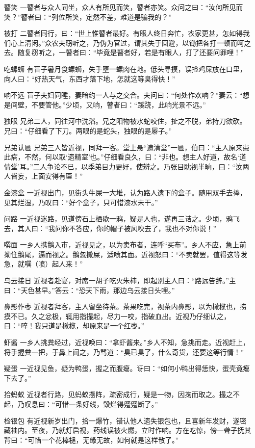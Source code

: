 \documentclass[12pt,UTF8]{ctexbook}
\begin{document}
瞽笑
一瞽者与众人同坐，众人有所见而笑，瞽者亦笑。众问之曰：“汝何所见而笑？”瞽者曰：“列位所笑，定然不差，难道是骗我的？”

被打
二瞽者同行，曰：“世上惟瞽者最好。有眼人终日奔忙，农家更甚，怎如得我们心上清闲。”众农夫窃听之，乃伪为官过，谓其失于回避，以锄把各打一顿而呵之去。随复窃听之，一瞽者曰：“毕竟是瞽者好，若是有眼人，打了还要问罪哩！”

吃螺蛳
有盲子暑月食螺蛳，失手堕一螺肉在地。低头寻摸，误捡鸡屎放在口里，向人曰：“好热天气，东西才落下地，怎就这等臭得快！”

响不远
盲子夫妇同睡，妻暗约一人与之交合。夫问曰：“何处作欢响？”妻云：“想是间壁，不要管他。”少顷，又响，瞽者曰：“蹊跷，此响光景不远。”

独眼
兄弟二人，同往河中洗浴。兄之阳物被水蛇咬住，扯之不脱，弟持刀欲砍。兄曰：“仔细看了下刀。两眼的是蛇头，独眼的是屪子。”

兄弟认匾
兄弟三人皆近视，同拜一客。堂上悬“遗清堂”一匾，伯曰：“主人原来患此病，不然，何以取‘遗精室’也。”仔细看良久，曰：“非也。想主人好道，故名‘道情堂’耳。”二人争论不已，以季弟目力更好，使辨之。乃张目眈视半晌，曰：“汝两人皆妄，上面安得有匾！”

金漆盒
一近视出门，见街头牛屎一大堆，认为路人遗下的盒子。随用双手去捧，见其烂湿，乃叹曰：“好个盒子，只可惜漆水未干。”

问路
一近视迷路，见道傍石上栖歇一鸦，疑是人也，遂再三诘之。少顷，鸦飞去，其人曰：“我问你不答应，你的帽子被风吹去了，我也不对你说！”

噀面
一乡人携鹅入市，近视见之，以为卖布者，连呼“买布”。乡人不应，急上前拗住鹅尾，逼而视之。鹅忽撒屎，适喷其面。近视怒曰：“不卖就罢，值得这等发急，就噀（喷）起人来！”

乌云接日
近视者赴宴，对席一胡子吃火朱柿，即起别主人曰：“路远告辞。”主曰：“天色甚早。”答云：“恐天下雨，那边乌云接日头哩。”

鼻影作枣
近视者拜客，主人留坐待茶。茶果吃完，视茶内鼻影，以为橄榄也，捞摸不已。久之忿极，辄用指撮起，尽力一咬，指破血出。近视乃仔细认之，曰：“啐！我只道是橄榄，却原来是一个红枣。”

虾酱
一乡人挑粪经过，近视唤曰：“拿虾酱来。”乡人不知，急挑而走。近视赶上，将手握粪一把，于鼻上闻之，乃骂道：“臭已臭了，什么奇货，还要这等行情！”

疑蛋
一近视见鱼，疑为鸭蛋，握之而腹瘪。讶曰：“如何小鸭出得恁快，蛋壳竟瘪下去了。”

拾蚂蚁
近视者行路，见蚂蚁摆阵，疏密成行，疑是一物，因掬而取之。撮之不起，乃叹息曰：“可惜一条好线，毁烂得蹙蹙断了。”

检银包
有近视新岁出门，拾一爆竹，错认他人遗失银包也，且喜新年发财，遂密藏袖内。至夜，乃就灯启视，药线误被火燃，立时作响。方在吃惊，傍一聋子抚其背曰：“可惜一个花棒槌，无缘无故，如何就是这样散了。”
\end{document}
